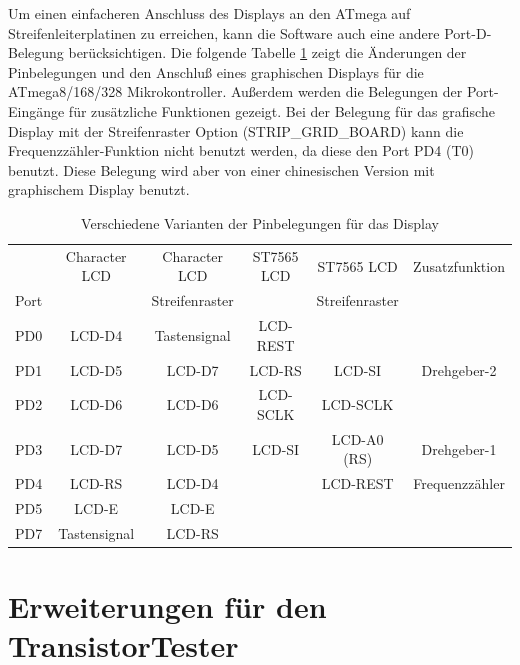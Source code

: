Um einen einfacheren Anschluss des Displays an den ATmega auf Streifenleiterplatinen zu erreichen,
kann die Software auch eine andere Port-D-Belegung berücksichtigen.
Die folgende Tabelle \ref{tab:grid-change} zeigt die Änderungen der Pinbelegungen und den
Anschluß eines graphischen Displays für die ATmega8/168/328 Mikrokontroller.
Außerdem werden die Belegungen der Port-Eingänge für zusätzliche Funktionen gezeigt. 
Bei der Belegung für das grafische Display mit der Streifenraster Option (STRIP\_GRID\_BOARD)
kann die Frequenzzähler-Funktion nicht benutzt werden, da diese den Port PD4 (T0) benutzt.
Diese Belegung wird aber von einer chinesischen Version mit graphischem Display benutzt.


\begin{table}[H]
  \begin{center}
    \begin{tabular}{| c || c | c | c | c | c |}
    \hline
           & Character LCD & Character LCD  & ST7565 LCD & ST7565 LCD     & Zusatzfunktion \\
      Port &               & Streifenraster &            & Streifenraster &  \\
    \hline
    \hline
    PD0    &  LCD-D4       &  Tastensignal  &  LCD-REST  &                &  \\
    \hline
    PD1    &  LCD-D5       &  LCD-D7        &  LCD-RS    & LCD-SI         & Drehgeber-2 \\
    \hline
    PD2    &  LCD-D6       &  LCD-D6        &  LCD-SCLK  & LCD-SCLK       &  \\
    \hline
    PD3    &  LCD-D7       &  LCD-D5        &  LCD-SI    & LCD-A0 (RS)    & Drehgeber-1 \\
    \hline
    PD4    &  LCD-RS       &  LCD-D4        &            & LCD-REST       & Frequenzzähler \\
    \hline
    PD5    &  LCD-E        &  LCD-E         &            &                &  \\
    \hline
    PD7    &  Tastensignal & LCD-RS         &            &                &  \\
    \hline
    \end{tabular}
  \end{center}
  \caption{Verschiedene Varianten der Pinbelegungen für das Display }
  \label{tab:grid-change}
\end{table}

\section{Erweiterungen für den TransistorTester}


